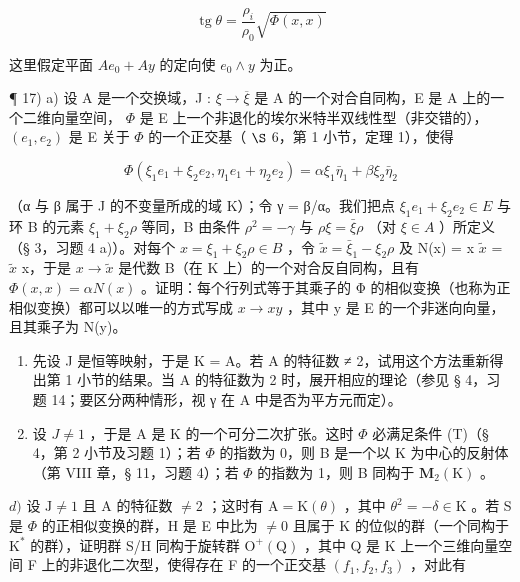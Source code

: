 \[
\operatorname{tg} \theta = \frac {\rho_ {i}}{\rho_ {0}} \sqrt {\Phi (x , x)}
\]

这里假定平面 \(Ae_{0} + Ay\) 的定向使 \(e_{0} \wedge y\) 为正。

¶ 17) a) 设 A 是一个交换域，J : \(\xi \to \overline{\xi}\) 是 A 的一个对合自同构，E 是 A 上的一个二维向量空间， \(\Phi\) 是 E 上一个非退化的埃尔米特半双线性型（非交错的）， \((e_1, e_2)\) 是 E 关于 \(\Phi\) 的一个正交基（ \(\S\) 6，第 1 小节，定理 1），使得

\[
\Phi (\xi_ {1} e _ {1} + \xi_ {2} e _ {2}, \eta_ {1} e _ {1} + \eta_ {2} e _ {2}) = \alpha \xi_ {1} \bar {\eta} _ {1} + \beta \xi_ {2} \bar {\eta} _ {2}
\]

（α 与 β 属于 J 的不变量所成的域 K）；令 γ = β/α。我们把点 \(\xi_{1}e_{1} + \xi_{2}e_{2} \in E\) 与环 B 的元素 \(\xi_{1} + \xi_{2}\rho\) 等同，B 由条件 \(\rho^{2} = -\gamma\) 与 \(\rho\xi = \bar{\xi}\rho\) （对 \(\xi \in A\) ）所定义（§ 3，习题 4 a)）。对每个 \(x = \xi_{1} + \xi_{2}\rho \in B\) ，令 \(\tilde{x} = \bar{\xi}_{1} - \xi_{2}\rho\) 及 N(x) = x \(\tilde{x}\) = \(\tilde{x}\) x，于是 \(x \to \tilde{x}\) 是代数 B（在 K 上）的一个对合反自同构，且有 \(\Phi(x, x) = \alpha N(x)\) 。证明：每个行列式等于其乘子的 Φ 的相似变换（也称为正相似变换）都可以以唯一的方式写成 \(x \to xy\) ，其中 y 是 E 的一个非迷向向量，且其乘子为 N(y)。

\begin{enumerate}
\def\labelenumi{\alph{enumi})}
\setcounter{enumi}{1}
\item
  先设 J 是恒等映射，于是 K = A。若 A 的特征数 ≠ 2，试用这个方法重新得出第 1 小节的结果。当 A 的特征数为 2 时，展开相应的理论（参见 § 4，习题 14；要区分两种情形，视 γ 在 A 中是否为平方元而定）。
\item
  设 \(J \neq 1\) ，于是 A 是 K 的一个可分二次扩张。这时 \(\Phi\) 必满足条件 (T)（§ 4，第 2 小节及习题 1）；若 \(\Phi\) 的指数为 0，则 B 是一个以 K 为中心的反射体（第 VIII 章，§ 11，习题 4）；若 \(\Phi\) 的指数为 1，则 B 同构于 \(\mathbf{M}_2(\mathrm{K})\) 。
\end{enumerate}

\(d)\) 设 \(\mathrm{J} \neq 1\) 且 A 的特征数 \(\neq 2\) ；这时有 \(\mathrm{A} = \mathrm{K}(\theta)\) ，其中 \(\theta^2 = -\delta \in \mathrm{K}\) 。若 S 是 \(\Phi\) 的正相似变换的群，H 是 E 中比为 \(\neq 0\) 且属于 K 的位似的群（一个同构于 \(\mathrm{K}^*\) 的群），证明群 S/H 同构于旋转群 \(\mathrm{O}^+(\mathrm{Q})\) ，其中 Q 是 K 上一个三维向量空间 F 上的非退化二次型，使得存在 F 的一个正交基 \((f_1, f_2, f_3)\) ，对此有

